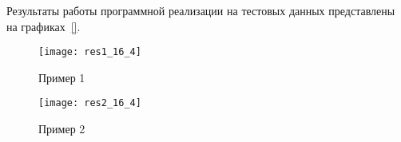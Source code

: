 

\label{sec:OCLprog}


Результаты работы программной реализации на тестовых данных представлены на графиках~\ref{}.

\begin{figure}[h!]
  \centering
  \texttt{[image: res1\_16\_4]} 
  \caption{Пример 1}
  \label{fig:res1}
\end{figure}
\FloatBarrier


\begin{figure}[h!]
  \centering
  \texttt{[image: res2\_16\_4]} 
  \caption{Пример 2}
  \label{fig:reg_net}
\end{figure}
\FloatBarrier





